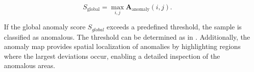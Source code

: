 \begin{equation}
S_{\text{global}} = \max_{i,j} \mathbf{A}_{\text{anomaly}}(i, j).
\end{equation}

\noindent If the global anomaly score $S_{global}$ exceeds a predefined threshold, the sample is classified as anomalous. The threshold can be determined as in \cite{bergmann2022mvtec, wang2023multimodal}. Additionally, the anomaly map provides spatial localization of anomalies by highlighting regions where the largest deviations occur, enabling a detailed inspection of the anomalous areas. 
